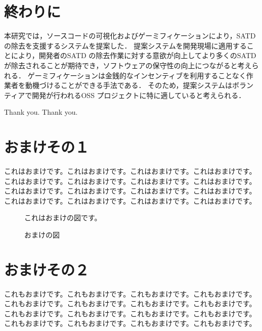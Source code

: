 \documentclass[12pt]{jarticle} %
\begin{document}
\section{終わりに}
本研究では，ソースコードの可視化およびゲーミフィケーションにより，SATD の除去を支援するシステムを提案した．
提案システムを開発現場に適用することにより，開発者のSATD の除去作業に対する意欲が向上してより多くのSATD が除去されることが期待でき，ソフトウェアの保守性の向上につながると考えられる．
ゲーミフィケーションは金銭的なインセンティブを利用することなく作業者を動機づけることができる手法である．
そのため，提案システムはボランティアで開発が行われるOSS プロジェクトに特に適していると考えられる．



%
%
\acknowledgements

Thank you. Thank you.


%
%
\newpage




%
%
\appendix

\section{おまけその１}
\label{omake1}

これはおまけです。これはおまけです。これはおまけです。これはおまけです。
これはおまけです。これはおまけです。これはおまけです。これはおまけです。
これはおまけです。これはおまけです。これはおまけです。これはおまけです。
これはおまけです。これはおまけです。これはおまけです。これはおまけです。

\begin{figure}
\centerline{これはおまけの図です。}
\caption{おまけの図}
\end{figure}


\section{おまけその２}

これもおまけです。これもおまけです。これもおまけです。これもおまけです。
これもおまけです。これもおまけです。これもおまけです。これもおまけです。
これもおまけです。これもおまけです。これもおまけです。これもおまけです。
これもおまけです。これもおまけです。これもおまけです。これもおまけです。
\end{document}

